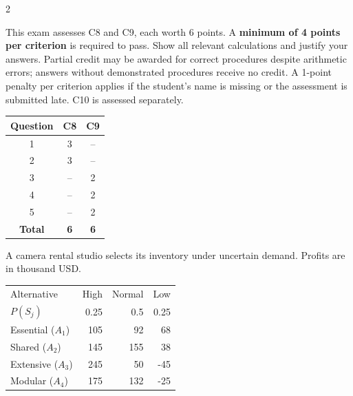 	\begin{multicols}{2}
		\raggedcolumns
		
		This exam assesses C8 and C9, each worth 6 points. A \textbf{minimum of 4 points per criterion} is required to pass. Show all relevant calculations and justify your answers. Partial credit may be awarded for correct procedures despite arithmetic errors; answers without demonstrated procedures receive no credit. A 1-point penalty per criterion applies if the student's name is missing or the assessment is submitted late. C10 is assessed separately.
		
		\vspace{-3mm}
		\begin{center}
			\begin{tabular}{|c|c|c|}
				\hline
				\textbf{Question} & \textbf{C8} & \textbf{C9} \\ \hline
				1 & 3 & -- \\ \hline
				2 & 3 & -- \\ \hline
				3 & -- & 2 \\ \hline
				4 & -- & 2 \\ \hline
				5 & -- & 2 \\ \hline
				\textbf{Total} & \textbf{6} & \textbf{6} \\ \hline
			\end{tabular}
		\end{center}
		\vspace{-3mm}
		
		
A camera rental studio selects its inventory under uncertain demand. Profits are in thousand USD.

\vspace{-3mm}
\begin{center}\small\setlength{\tabcolsep}{4pt}
	\begin{tabular}{lrrr}\toprule
		Alternative & High & Normal & Low\\
		$P(S_j)$ & 0.25 & 0.5 & 0.25\\ \midrule
				Essential ($A_1$) & 105 & 92 & 68\\
		Shared ($A_2$) & 145 & 155 & 38\\
		Extensive ($A_3$) & 245 & 50 & -45\\
		Modular ($A_4$) & 175 & 132 & -25\\
		\bottomrule
	\end{tabular}
\end{center} \vspace*{-3mm}


\end{multicols}
